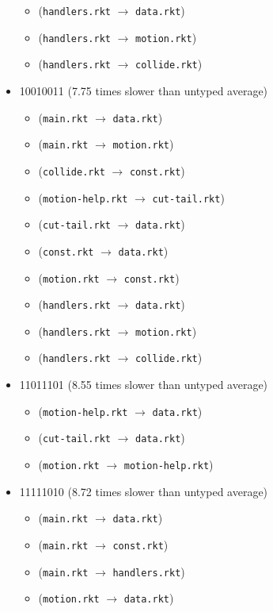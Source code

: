 \documentclass{article}
\newcommand{\mono}[1]{\texttt{#1}}
\begin{document}
\begin{itemize}
\begin{itemize}
  \item (\mono{handlers.rkt} $\rightarrow$ \mono{data.rkt})
  \item (\mono{handlers.rkt} $\rightarrow$ \mono{motion.rkt})
  \item (\mono{handlers.rkt} $\rightarrow$ \mono{collide.rkt})
  \end{itemize}
\item 10010011 (7.75 times slower than untyped average)
  \begin{itemize}
  \item (\mono{main.rkt} $\rightarrow$ \mono{data.rkt})
  \item (\mono{main.rkt} $\rightarrow$ \mono{motion.rkt})
  \item (\mono{collide.rkt} $\rightarrow$ \mono{const.rkt})
  \item (\mono{motion-help.rkt} $\rightarrow$ \mono{cut-tail.rkt})
  \item (\mono{cut-tail.rkt} $\rightarrow$ \mono{data.rkt})
  \item (\mono{const.rkt} $\rightarrow$ \mono{data.rkt})
  \item (\mono{motion.rkt} $\rightarrow$ \mono{const.rkt})
  \item (\mono{handlers.rkt} $\rightarrow$ \mono{data.rkt})
  \item (\mono{handlers.rkt} $\rightarrow$ \mono{motion.rkt})
  \item (\mono{handlers.rkt} $\rightarrow$ \mono{collide.rkt})
  \end{itemize}
\item 11011101 (8.55 times slower than untyped average)
  \begin{itemize}
  \item (\mono{motion-help.rkt} $\rightarrow$ \mono{data.rkt})
  \item (\mono{cut-tail.rkt} $\rightarrow$ \mono{data.rkt})
  \item (\mono{motion.rkt} $\rightarrow$ \mono{motion-help.rkt})
  \end{itemize}
\item 11111010 (8.72 times slower than untyped average)
  \begin{itemize}
  \item (\mono{main.rkt} $\rightarrow$ \mono{data.rkt})
  \item (\mono{main.rkt} $\rightarrow$ \mono{const.rkt})
  \item (\mono{main.rkt} $\rightarrow$ \mono{handlers.rkt})
  \item (\mono{motion.rkt} $\rightarrow$ \mono{data.rkt})

\end{itemize}
\end{itemize}
\end{document}

